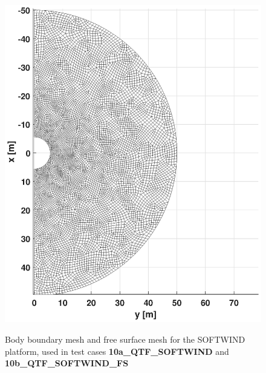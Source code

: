 \documentclass[12pt,a4paper,titlepage]{article}
\begin{document}
\begin{itemize}
\begin{figure}[h!tbp]
{\includegraphics[scale=0.45,trim = 120mm 8mm 170mm 16mm, clip]{figures/Softwind/FSmesh.eps}	
}
\caption{Body boundary mesh and free surface mesh for the SOFTWIND platform, used in test cases \textbf{10a\_QTF\_SOFTWIND} and  \textbf{10b\_QTF\_SOFTWIND\_FS}}\label{fig:meshesSoftwind}
\end{figure}




\end{itemize}
\end{document}
